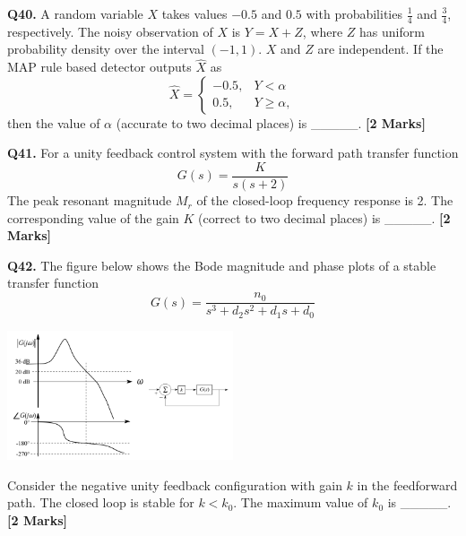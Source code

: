 \documentclass[11pt]{article}
\newcommand{\questionb}[2]{
    \noindent\textbf{Q#2.} #1 \hfill \textbf{[2 Marks]}
}
\begin{document}
\vspace{0.5cm}

\questionb{A random variable $X$ takes values $-0.5$ and $0.5$ with probabilities $\frac{1}{4}$ and $\frac{3}{4}$, respectively. The noisy observation of $X$ is $Y = X + Z$, where $Z$ has uniform probability density over the interval $(-1, 1)$. $X$ and $Z$ are independent. If the MAP rule based detector outputs $\hat{X}$ as
\[
\hat{X} = 
\begin{cases} 
-0.5, & Y < \alpha \\ 
0.5, & Y \geq \alpha,
\end{cases}
\]
then the value of $\alpha$ (accurate to two decimal places) is \_\_\_\_\_.}{40}

\vspace{0.5cm}

\questionb{For a unity feedback control system with the forward path transfer function
\[ G(s) = \frac{K}{s(s+2)} \]
The peak resonant magnitude $M_r$ of the closed-loop frequency response is 2. The corresponding value of the gain $K$ (correct to two decimal places) is \_\_\_\_\_.}{41}

\vspace{0.5cm}

\questionb{The figure below shows the Bode magnitude and phase plots of a stable transfer function
\[ G(s) = \frac{n_0}{s^3 + d_2 s^2 + d_1 s + d_0} \]

\begin{center}
\includegraphics[width=0.5\textwidth]{figures/42.png}
\end{center}

Consider the negative unity feedback configuration with gain $k$ in the feedforward path. The closed loop is stable for $k < k_0$. The maximum value of $k_0$ is \_\_\_\_\_.}{42}

\vspace{0.5cm}
\end{document}

